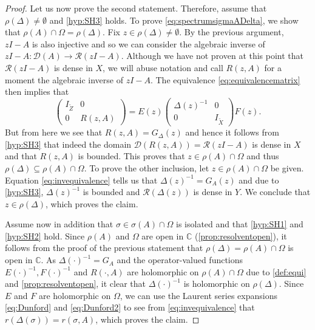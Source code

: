 \documentclass[english]{myarticle}
\begin{document}
\begin{sloppypar}
\begin{proof}
Let us now prove the second statement. Therefore, assume that $\rho(\Delta) \neq \emptyset$ and \ref{hyp:SH3} holds. To prove \eqref{eq:spectrumsigmaADelta}, we show that $\rho(A) \cap \Omega = \rho(\Delta)$. 
Fix $z \in \rho(\Delta) \neq \emptyset$. By the previous argument, $zI - A$ is also injective and so we can consider the algebraic inverse of $zI - A: \mathcal{D}(A) \to \mathcal{R}(zI - A)$. Although we have not proven at this point that $\mathcal{R}(zI - A)$ is dense in $X$, we will abuse notation and call $R(z, A)$ for a moment the algebraic inverse of $zI-A$. The equivalence \eqref{eq:equivalencematrix} then implies that 
\begin{equation} \label{eq:invequivalence}
     \begin{pmatrix}
         I_{\tilde{Z}}& 0 \\
         0 & R(z,A)
     \end{pmatrix}
     =
     E(z)
     \begin{pmatrix}
         \Delta(z)^{-1} & 0 \\
         0 & I_{\tilde{X}}
     \end{pmatrix}
     F(z).
\end{equation}
But from here we see that $R(z,A) = G_\Delta(z)$ and hence it follows from \ref{hyp:SH3} that indeed the domain $\mathcal{D}(R(z, A)) = \mathcal{R}(zI - A)$ is dense in $X$ and that $R(z, A)$ is bounded. This proves that $z \in \rho(A) \cap \Omega$ and thus $\rho(\Delta) \subseteq \rho(A) \cap \Omega$. 
To prove the other inclusion, let $z \in \rho(A) \cap \Omega$ be given. Equation \eqref{eq:invequivalence} tells us that $\Delta(z)^{-1} = G_A(z)$ and due to \ref{hyp:SH3}, $\Delta(z)^{-1}$ is bounded and $\mathcal{R}(\Delta(z))$ is dense in $Y$. We conclude that $z \in \rho(\Delta)$, which proves the claim.

Assume now in addition that $\sigma \in \sigma(A) \cap \Omega$ is isolated and that \ref{hyp:SH1} and \ref{hyp:SH2} hold. Since $\rho(A)$ and $\Omega$ are open in $\mathbb{C}$ (\cref{prop:resolventopen}), it follows from the proof of the previous statement that $\rho(\Delta) = \rho(A) \cap \Omega$ is open in $\mathbb{C}$. As $\Delta(\cdot)^{-1}= G_A$ and the operator-valued functions $E(\cdot)^{-1}, F(\cdot)^{-1}$ and $R(\cdot,A)$ are holomorphic on $\rho(A) \cap \Omega$ due to \cref{def:equi} and \cref{prop:resolventopen}, it clear that $\Delta(\cdot)^{-1}$ is holomorphic on $\rho(\Delta)$. Since $E$ and $F$ are holomorphic on $\Omega$, we can use the Laurent series expansions \eqref{eq:Dunford} and \eqref{eq:Dunford2} to see from \eqref{eq:invequivalence} that $r(\Delta(\sigma)) = r(\sigma,A)$, which proves the claim.


\end{proof}
\end{sloppypar}
\end{document}
